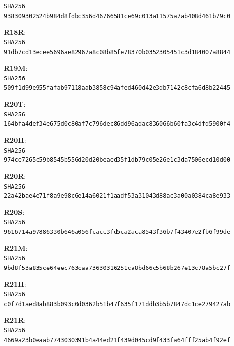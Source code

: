 \documentclass[11pt,a4paper]{article}
\begin{document}
\texttt{SHA256 938309302524b984d8fdbc356d467665\allowbreak 81ce69c013a11575a7ab408d461b79c0}\par\medskip
\textbf{R18R}: \\
\texttt{SHA256 91db7cd13ecee5696ae82967a8c08b85\allowbreak fe78370b0352305451c3d184007a8844}\par\medskip
\textbf{R19M}: \\
\texttt{SHA256 509f1d99e955fafab97118aab3858c94\allowbreak afed460d42e3db7142c8cfa6d8b22445}\par\medskip
\textbf{R20T}: \\
\texttt{SHA256 164bfa4def34e675d0c80af7c796dec8\allowbreak 6dd96adac836066b60fa3c4dfd5900f4}\par\medskip
\textbf{R20H}: \\
\texttt{SHA256 974ce7265c59b8545b556d20d20beaed\allowbreak 35f1db79c05e26e1c3da7506ecd10d00}\par\medskip
\textbf{R20R}: \\
\texttt{SHA256 22a42bae4e71f8a9e98c6e14a6021f1a\allowbreak adf53a31043d88ac3a00a0384ca8e933}\par\medskip
\textbf{R20S}: \\
\texttt{SHA256 9616714a97886330b646a056fcacc3fd\allowbreak 5ca2aca8543f36b7f43407e2fb6f99de}\par\medskip
\textbf{R21M}: \\
\texttt{SHA256 9bd8f53a835ce64eec763caa73630316\allowbreak 251ca8bd66c5b68b267e13c78a5bc27f}\par\medskip
\textbf{R21H}: \\
\texttt{SHA256 c0f7d1aed8ab883b093c0d0362b51b47\allowbreak f635f171ddb3b5b7847dc1ce279427ab}\par\medskip
\textbf{R21R}: \\
\texttt{SHA256 4669a23b0eaab7743030391b4a44ed21\allowbreak f439d045cd9f433fa64fff25ab4f92ef}\par\medskip
\end{document}
